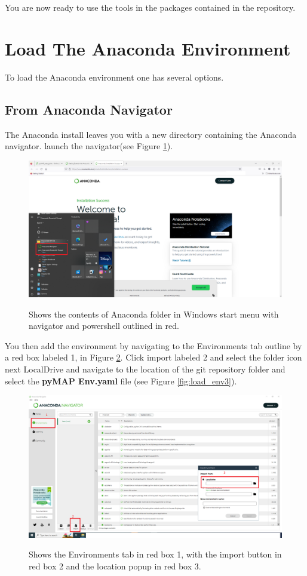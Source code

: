 \documentclass{article}
\begin{document}
You are now ready to use the tools in the packages contained in the repository. 


\section{Load The Anaconda Environment}
To load the Anaconda environment one has several options.
\subsection{From Anaconda Navigator}
The Anaconda install leaves you with a new directory containing the Anaconda navigator. launch the navigator(see Figure \ref{fig:load_env1}).

\begin{figure}[H]
\centering
\includegraphics[scale=0.4]{load_env1.png}
\label{fig:load_env1}
\caption{ Shows the contents of Anaconda folder in Windows start menu with navigator and powershell outlined in red.}
\end{figure}

You then add the environment by navigating to the Environments tab outline by a red box labeled 1, in Figure \ref{fig:load_env2}. Click import labeled 2 and select the folder icon next LocalDrive and navigate to the location of the git repository folder and select the \textbf{pyMAP Env.yaml} file (see Figure \ref{fig:load_env3}).

\begin{figure}[H]
\centering
\includegraphics[scale=0.4]{load_env2.png}
\label{fig:load_env2}
\caption{ Shows the Environments tab in red box 1, with the import button in red box 2 and the location popup in red box 3.}
\end{figure}
\end{document}
